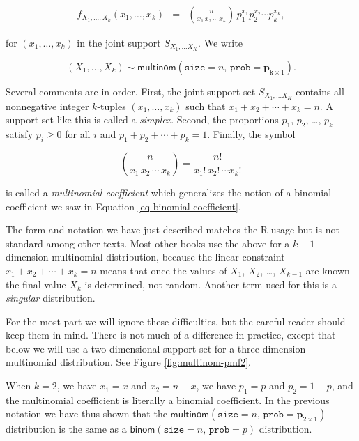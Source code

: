 \documentclass[]{book}
\numberwithin{equation}{chapter}
\numberwithin{figure}{chapter}
\theoremstyle{plain}
\theoremstyle{definition}
\theoremstyle{remark}
\theoremstyle{definition}
\theoremstyle{definition}
\theoremstyle{remark}
\begin{document}
\begin{eqnarray}
f_{X_{1},\ldots,X_{k}}(x_{1},\ldots,x_{k}) & = & {n \choose x_{1}\, x_{2}\,\cdots\, x_{k}}\, p_{1}^{x_{1}}p_{2}^{x_{2}}\cdots p_{k}^{x_{k}},
\end{eqnarray}

for \((x_{1},\ldots,x_{k})\) in the joint support
\(S_{X_{1},\ldots X_{K}}\). We write

\begin{equation}
(X_{1},\ldots,X_{k})\sim\mathsf{multinom}(\mathtt{size}=n,\,\mathtt{prob}=\mathbf{p}_{\mathrm{k}\times1}).
\end{equation}

Several comments are in order. First, the joint support set
\(S_{X_{1},\ldots X_{K}}\) contains all nonnegative integer \(k\)-tuples
\((x_{1},\ldots,x_{k})\) such that \(x_{1}+x_{2}+\cdots+x_{k}=n\). A
support set like this is called a \emph{simplex}. Second, the
proportions \(p_{1}\), \(p_{2}\), \ldots{}, \(p_{k}\) satisfy
\(p_{i}\geq0\) for all \(i\) and \(p_{1}+p_{2}+\cdots+p_{k}=1\).
Finally, the symbol

\begin{equation}
{n \choose x_{1}\, x_{2}\,\cdots\, x_{k}}=\frac{n!}{x_{1}!\, x_{2}!\,\cdots x_{k}!}
\end{equation}

is called a \emph{multinomial coefficient} which generalizes the notion
of a binomial coefficient we saw in Equation
\eqref{eq-binomial-coefficient}.

The form and notation we have just described matches the R usage but is
not standard among other texts. Most other books use the above for a
\(k-1\) dimension multinomial distribution, because the linear
constraint \(x_{1}+x_{2}+\cdots+x_{k}=n\) means that once the values of
\(X_{1}\), \(X_{2}\), \ldots{}, \(X_{k-1}\) are known the final value
\(X_{k}\) is determined, not random. Another term used for this is a
\emph{singular} distribution.

For the most part we will ignore these difficulties, but the careful
reader should keep them in mind. There is not much of a difference in
practice, except that below we will use a two-dimensional support set
for a three-dimension multinomial distribution. See Figure
\ref{fig:multinom-pmf2}.

When \(k=2\), we have \(x_{1}=x\) and \(x_{2}=n-x\), we have \(p_{1}=p\)
and \(p_{2}=1-p\), and the multinomial coefficient is literally a
binomial coefficient. In the previous notation we have thus shown that
the
\(\mathsf{multinom}(\mathtt{size}=n,\,\mathtt{prob}=\mathbf{p}_{2\times1})\)
distribution is the same as a
\(\mathsf{binom}(\mathtt{size}=n,\,\mathtt{prob}=p)\) distribution.
\end{document}
